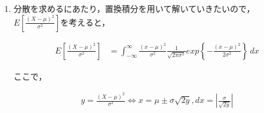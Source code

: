 \documentclass[a4paper,10pt]{jarticle}
\begin{document}
\begin{enumerate}
\begin{equation}
	\label{equ14}
	\begin{split}
	E[X-\mu] &= \int_{-\infty}^{\infty} (x-\mu) \frac{1}{\sqrt{2\pi\sigma^2}} exp\left\{ -\frac{(x-\mu)^2}{2\sigma^2}\right\}  \,dx \\
					 &= \int_{-\infty}^{\mu} (x-\mu) \frac{1}{\sqrt{2\pi\sigma^2}} exp\left\{ -\frac{(x-\mu)^2}{2\sigma^2}\right\}  \,dx + \int_{\mu}^{\infty} (x-\mu) \frac{1}{\sqrt{2\pi\sigma^2}} exp\left\{ -\frac{(x-\mu)^2}{2\sigma^2}\right\}  \,dx \\
					 &= \int_{-\infty}^{\mu} (x-\mu) \frac{1}{\sqrt{2\pi\sigma^2}} exp\left\{ -\frac{(x-\mu)^2}{2\sigma^2}\right\}  \,dx - \int_{-\infty}^{\mu} (x-\mu) \frac{1}{\sqrt{2\pi\sigma^2}} exp\left\{ -\frac{(x-\mu)^2}{2\sigma^2}\right\}  \,dx \\
					 &= 0
	\end{split}
	\end{equation}

となる.よって,線形性から

\begin{equation}
	\label{equ15}
	\begin{split}
	E[X-\mu] = 0 \Longleftrightarrow E[X] = \mu
	\end{split}
	\end{equation}

が得られ，求める平均値は\fbox{$\mu$}となる．

\vspace{6mm}


\item 分散を求めるにあたり，置換積分を用いて解いていきたいので，$E[\frac{(X-\mu)^2}{\sigma^2}]$を考えると，

\begin{equation}
	\label{equ16}
	\begin{split}
	E[\frac{(X-\mu)^2}{\sigma^2}] &= \int_{-\infty}^{\infty} \frac{(x-\mu)^2}{\sigma^2} \frac{1}{\sqrt{2\pi\sigma^2}} exp\left\{ -\frac{(x-\mu)^2}{2\sigma^2}\right\}  \,dx 
	\end{split}
	\end{equation}

ここで，

\begin{equation}
	\label{equ17}
	\begin{split}
	y = \frac{(X-\mu)^2}{\sigma^2} \Longleftrightarrow x = \mu \pm \sigma\sqrt{2y} , dx = \left\lvert \frac{\sigma}{\sqrt{2y}} \right\rvert 
	\end{split}
	\end{equation}


\end{enumerate}
\end{document}
